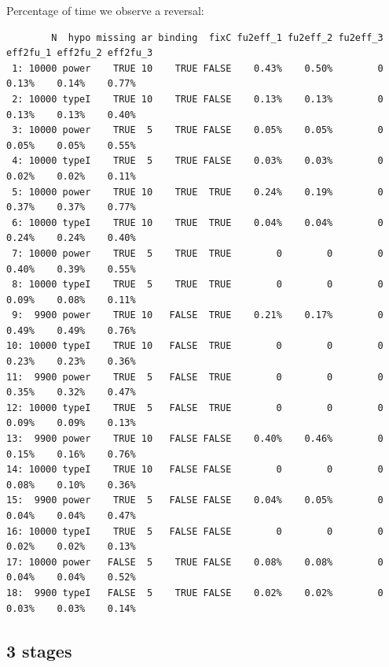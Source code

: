 \documentclass[12pt]{article}
\begin{document}
Percentage of time we observe a reversal:
\begin{verbatim}
        N  hypo missing ar binding  fixC fu2eff_1 fu2eff_2 fu2eff_3 eff2fu_1 eff2fu_2 eff2fu_3
 1: 10000 power    TRUE 10    TRUE FALSE    0.43%    0.50%        0    0.13%    0.14%    0.77%
 2: 10000 typeI    TRUE 10    TRUE FALSE    0.13%    0.13%        0    0.13%    0.13%    0.40%
 3: 10000 power    TRUE  5    TRUE FALSE    0.05%    0.05%        0    0.05%    0.05%    0.55%
 4: 10000 typeI    TRUE  5    TRUE FALSE    0.03%    0.03%        0    0.02%    0.02%    0.11%
 5: 10000 power    TRUE 10    TRUE  TRUE    0.24%    0.19%        0    0.37%    0.37%    0.77%
 6: 10000 typeI    TRUE 10    TRUE  TRUE    0.04%    0.04%        0    0.24%    0.24%    0.40%
 7: 10000 power    TRUE  5    TRUE  TRUE        0        0        0    0.40%    0.39%    0.55%
 8: 10000 typeI    TRUE  5    TRUE  TRUE        0        0        0    0.09%    0.08%    0.11%
 9:  9900 power    TRUE 10   FALSE  TRUE    0.21%    0.17%        0    0.49%    0.49%    0.76%
10: 10000 typeI    TRUE 10   FALSE  TRUE        0        0        0    0.23%    0.23%    0.36%
11:  9900 power    TRUE  5   FALSE  TRUE        0        0        0    0.35%    0.32%    0.47%
12: 10000 typeI    TRUE  5   FALSE  TRUE        0        0        0    0.09%    0.09%    0.13%
13:  9900 power    TRUE 10   FALSE FALSE    0.40%    0.46%        0    0.15%    0.16%    0.76%
14: 10000 typeI    TRUE 10   FALSE FALSE        0        0        0    0.08%    0.10%    0.36%
15:  9900 power    TRUE  5   FALSE FALSE    0.04%    0.05%        0    0.04%    0.04%    0.47%
16: 10000 typeI    TRUE  5   FALSE FALSE        0        0        0    0.02%    0.02%    0.13%
17: 10000 power   FALSE  5    TRUE FALSE    0.08%    0.08%        0    0.04%    0.04%    0.52%
18:  9900 typeI   FALSE  5    TRUE FALSE    0.02%    0.02%        0    0.03%    0.03%    0.14%
\end{verbatim}

\clearpage

\subsection{3 stages}
\label{sec:orgb9db3eb}
\end{document}
